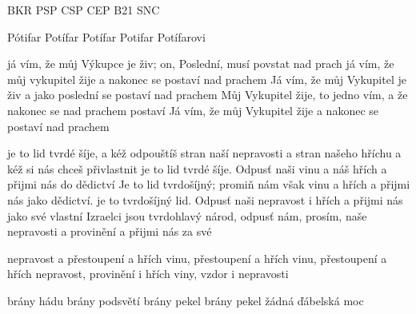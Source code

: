  {BKR} {PSP} {CSP} {CEP} {B21} {SNC}








 {Pótifar} {Potífar} {Potífar} {Potifar} {Potífarovi} 

        {já vím, že můj Výkupce je živ; on, Poslední, musí povstat nad prach}  %
        {já vím, že můj vykupitel žije a nakonec se postaví nad prachem}  %
        {Já vím, že můj Vykupitel je živ a jako poslední se postaví nad prachem}  %
        {Můj Vykupitel žije, to jedno vím, a že nakonec se nad prachem postaví}  %
        {Já vím, že můj Vykupitel žije a nakonec se postaví nad prachem}  %
        
\vdef   {}  %
        {}  %
        {}  %
        {}  %
        {}  %
        {}  %
        

      {je to lid tvrdé šíje, a kéž odpouštíš stran naší nepravosti a stran našeho hříchu a kéž si nás chceš přivlastnit}
      {je to lid tvrdé šíje. Odpusť naši vinu a náš hřích a přijmi nás do dědictví}
      {Je to lid tvrdošíjný; promiň nám však vinu a hřích a přijmi nás jako dědictví.}
      {je to tvrdošíjný lid. Odpusť naši nepravost i hřích a přijmi nás jako své vlastní}
      {Izraelci jsou tvrdohlavý národ, odpusť nám, prosím, naše nepravosti a provinění a přijmi nás za své}
      
      {nepravost a přestoupení a hřích}
      {vinu, přestoupení a hřích}
      {vinu, přestoupení a hřích}
      {nepravost, provinění i hřích}
      {viny, vzdor i nepravosti}
      
      {brány hádu}
      {brány podsvětí}
      {brány pekel}
      {brány pekel}
      {žádná ďábelská moc}
      

